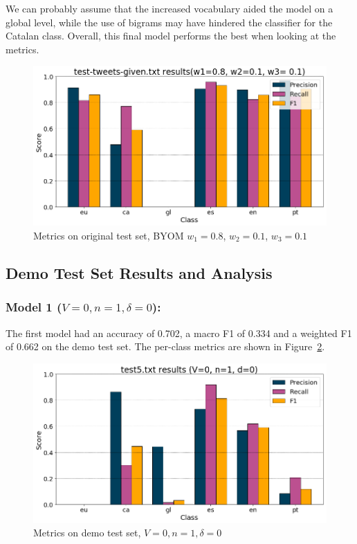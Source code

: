 \documentclass[runningheads]{llncs}
\begin{document}
We can probably assume that the increased vocabulary aided the model on a global level, while the use of bigrams may have hindered the classifier for the Catalan class. Overall, this final model performs the best when looking at the metrics.

\begin{figure}
    \begin{center}
        \includegraphics[width=12.5cm]{images/test_tweets_given_results_BYOM.png}
        \caption{Metrics on original test set, BYOM $w_1=0.8$, $w_2=0.1$, $w_3=0.1$}
        \label{fig:pre_demo_BYOM}
    \end{center}
\end{figure}

\newpage

\subsection{Demo Test Set Results and Analysis}

\subsubsection{Model 1 ($V=0, n=1, \delta=0$): }
The first model had an accuracy of 0.702, a macro F1 of 0.334 and a weighted F1 of 0.662 on the demo test set. The per-class metrics are shown in Figure~\ref{fig:demo_0_1_0}. \\

\begin{figure}
    \begin{center}
        \includegraphics[width=12.5cm]{images/test5_results_0_1_0.png}
        \caption{Metrics on demo test set, $V=0, n=1, \delta=0$}
        \label{fig:demo_0_1_0}
    \end{center}
\end{figure}
\end{document}
